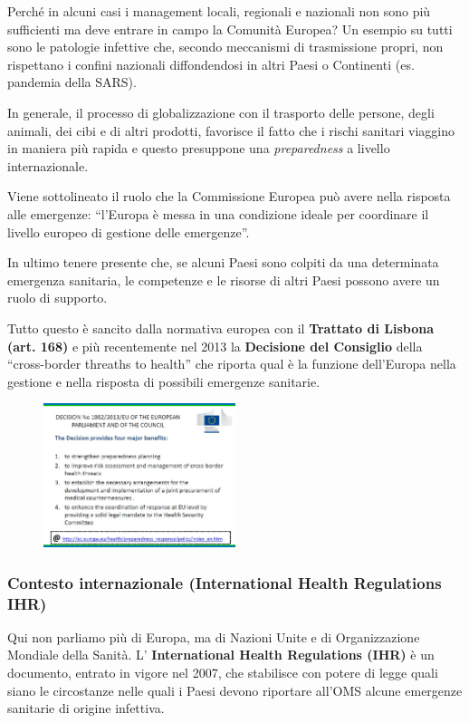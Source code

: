 Perché in alcuni casi i management locali, regionali e nazionali non
sono più sufficienti ma deve entrare in campo la Comunità Europea? Un
esempio su tutti sono le patologie infettive che, secondo meccanismi di
trasmissione propri, non rispettano i confini nazionali diffondendosi in
altri Paesi o Continenti (es. pandemia della SARS).

In generale, il processo di globalizzazione con il trasporto delle
persone, degli animali, dei cibi e di altri prodotti, favorisce il fatto
che i rischi sanitari viaggino in maniera più rapida e questo presuppone
una \emph{preparedness} a livello internazionale.

Viene sottolineato il ruolo che la Commissione Europea può avere nella
risposta alle emergenze: ``l'Europa è messa in una condizione ideale per
coordinare il livello europeo di gestione delle emergenze''.

In ultimo tenere presente che, se alcuni Paesi sono colpiti da una
determinata emergenza sanitaria, le competenze e le risorse di altri
Paesi possono avere un ruolo di supporto.

Tutto questo è sancito dalla normativa europea con il \textbf{Trattato
di Lisbona (art. 168)} e più recentemente nel 2013 la \textbf{Decisione
del Consiglio} della ``cross-border threaths to health'' che riporta
qual è la funzione dell'Europa nella gestione e nella risposta di
possibili emergenze sanitarie.

\begin{figure}[!ht]
\centering
	\includegraphics[width=0.5\textwidth]{26/image5.jpeg}
	\end{figure}

\subsubsection{Contesto internazionale (International Health Regulations IHR)}

Qui non parliamo più di Europa, ma di Nazioni Unite e di Organizzazione
Mondiale della Sanità. L' \textbf{International Health Regulations
(IHR)} è un documento, entrato in vigore nel 2007, che stabilisce con
potere di legge quali siano le circostanze nelle quali i Paesi devono
riportare all'OMS alcune emergenze sanitarie di origine infettiva.

